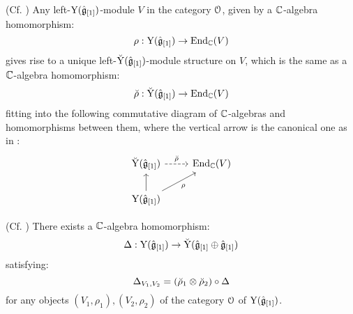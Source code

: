         \begin{lemma} \label{lemma: lifting_representations_of_affine_yangians_to_root_grading_completions}
            (Cf. \cite[Proposition 5.14]{guay_nakajima_wendlandt_affine_yangian_coproduct}) Any left-$\mathrm{Y}(\hat{\mathfrak{g}}_{[1]})$-module $V$ in the category $\mathcal{O}$, given by a $\mathbb{C}$-algebra homomorphism:
                $$\rho: \mathrm{Y}(\hat{\mathfrak{g}}_{[1]}) \to \mathrm{End}_{\mathbb{C}}(V)$$
            gives rise to a unique left-$\breve{\mathrm{Y}}(\hat{\mathfrak{g}}_{[1]})$-module structure on $V$, which is the same as a $\mathbb{C}$-algebra homomorphism:
                $$\breve{\rho}: \breve{\mathrm{Y}}(\hat{\mathfrak{g}}_{[1]}) \to \mathrm{End}_{\mathbb{C}}(V)$$
            fitting into the following commutative diagram of $\mathbb{C}$-algebras and homomorphisms between them, where the vertical arrow is the canonical one as in \cite[Section 5, Lemma 5.3]{guay_nakajima_wendlandt_affine_yangian_coproduct}:
                $$
                    \begin{tikzcd}
                	{\breve{\rmY}(\hat{\g}_{[1]})} & {\End_{\bbC}(V)} \\
                	{\rmY(\hat{\g}_{[1]})}
                	\arrow[from=2-1, to=1-1]
                	\arrow["{\breve{\rho}}", dashed, from=1-1, to=1-2]
                	\arrow["\rho"', from=2-1, to=1-2]
                    \end{tikzcd}
                $$
        \end{lemma}
        \begin{proposition} \label{prop: hopf_coproduct_on_yangians}
            (Cf. \cite[Proposition 5.18]{guay_nakajima_wendlandt_affine_yangian_coproduct}) There exists a $\mathbb{C}$-algebra homomorphism:
                $$\Delta: \mathrm{Y}(\hat{\mathfrak{g}}_{[1]}) \to \breve{\mathrm{Y}}(\hat{\mathfrak{g}}_{[1]} \oplus \hat{\mathfrak{g}}_{[1]})$$
            satisfying:
                $$\Delta_{V_1, V_2} = (\breve{\rho}_1 \tensor \breve{\rho}_2) \circ \Delta$$
            for any objects $(V_1, \rho_1), (V_2, \rho_2)$ of the category $\mathcal{O}$ of $\mathrm{Y}(\hat{\mathfrak{g}}_{[1]})$.
        \end{proposition}
        
